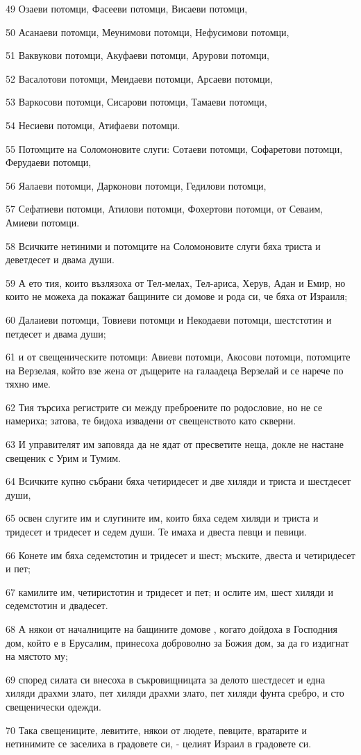 \par 49 Озаеви потомци, Фасееви потомци, Висаеви потомци,
\par 50 Асанаеви потомци, Меунимови потомци, Нефусимови потомци,
\par 51 Ваквукови потомци, Акуфаеви потомци, Арурови потомци,
\par 52 Васалотови потомци, Меидаеви потомци, Арсаеви потомци,
\par 53 Варкосови потомци, Сисарови потомци, Тамаеви потомци,
\par 54 Несиеви потомци, Атифаеви потомци.
\par 55 Потомците на Соломоновите слуги: Сотаеви потомци, Софаретови потомци, Ферудаеви потомци,
\par 56 Яалаеви потомци, Дарконови потомци, Гедилови потомци,
\par 57 Сефатиеви потомци, Атилови потомци, Фохертови потомци, от Севаим, Амиеви потомци.
\par 58 Всичките нетиними и потомците на Соломоновите слуги бяха триста и деветдесет и двама души.
\par 59 А ето тия, които възлязоха от Тел-мелах, Тел-ариса, Херув, Адан и Емир, но които не можеха да покажат бащините си домове и рода си, че бяха от Израиля;
\par 60 Далаиеви потомци, Товиеви потомци и Некодаеви потомци, шестстотин и петдесет и двама души;
\par 61 и от свещеническите потомци: Авиеви потомци, Акосови потомци, потомците на Верзелая, който взе жена от дъщерите на галаадеца Верзелай и се нарече по тяхно име.
\par 62 Тия търсиха регистрите си между преброените по родословие, но не се намериха; затова, те бидоха извадени от свещенството като скверни.
\par 63 И управителят им заповяда да не ядат от пресветите неща, докле не настане свещеник с Урим и Тумим.
\par 64 Всичките купно събрани бяха четиридесет и две хиляди и триста и шестдесет души,
\par 65 освен слугите им и слугините им, които бяха седем хиляди и триста и тридесет и тридесет и седем души. Те имаха и двеста певци и певици.
\par 66 Конете им бяха седемстотин и тридесет и шест; мъските, двеста и четиридесет и пет;
\par 67 камилите им, четиристотин и тридесет и пет; и ослите им, шест хиляди и седемстотин и двадесет.
\par 68 А някои от началниците на бащините домове , когато дойдоха в Господния дом, който е в Ерусалим, принесоха доброволно за Божия дом, за да го издигнат на мястото му;
\par 69 според силата си внесоха в съкровищницата за делото шестдесет и една хиляди драхми злато, пет хиляди драхми злато, пет хиляди фунта сребро, и сто свещенически одежди.
\par 70 Така свещениците, левитите, някои от людете, певците, вратарите и нетинимите се заселиха в градовете си, - целият Израил в градовете си.

